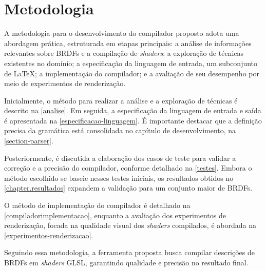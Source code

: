 \chapter{Metodologia} \label{metodologia}

A metodologia para o desenvolvimento do compilador proposto adota uma abordagem prática, estruturada em etapas principais: a análise de informações relevantes sobre BRDFs e a compilação de \textit{shaders}; a exploração de técnicas existentes no domínio; a especificação da linguagem de entrada, um subconjunto de \LaTeX{}; a implementação do compilador; e a avaliação de seu desempenho por meio de experimentos de renderização.

Inicialmente, o método para realizar a análise e a exploração de técnicas é descrito na \autoref{analise}. Em seguida, a especificação da linguagem de entrada e saída é apresentada na \autoref{especificacao-linguagem}. É importante destacar que a definição precisa da gramática está consolidada no capítulo de desenvolvimento, na \autoref{section-parser}.

Posteriormente, é discutida a elaboração dos casos de teste para validar a correção e a precisão do compilador, conforme detalhado na \autoref{testes}. Embora o método escolhido se baseie nesses testes iniciais, os resultados obtidos no \autoref{chapter.resultados} expandem a validação para um conjunto maior de BRDFs.

O método de implementação do compilador é detalhado na \autoref{compiladorimplementacao}, enquanto a avaliação dos experimentos de renderização, focada na qualidade visual dos \textit{shaders} compilados, é abordada na \autoref{experimentos-renderizacao}.


Seguindo essa metodologia, a ferramenta proposta busca compilar descrições de BRDFs em \textit{shaders} GLSL, garantindo qualidade e precisão no resultado final.




